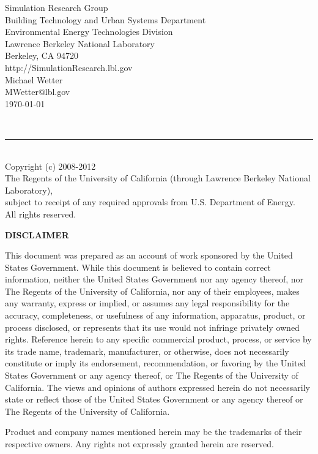 \documentclass[11pt]{report}
\renewcommand{\date}{\today}
\begin{document}
\begin{titlepage}
\begin{minipage}{\headwidth}
\begin{center}
\large{Simulation Research Group}\\
\large{Building Technology and Urban Systems Department}\\
 \large{Environmental
Energy Technologies Division}\\
\large{Lawrence Berkeley National
Laboratory}\\
\large{Berkeley, CA 94720}
\\[10mm]
\large{http://SimulationResearch.lbl.gov}
\\[10mm]
\large{Michael Wetter}\\
\large{MWetter@lbl.gov}
\\[10mm]
\large{\date}
\\[40mm]
\end{center}
~\\[15mm]
\hrule
~\\[2mm]
Copyright (c) 2008-2012\\
The Regents of the University of California 
(through Lawrence Berkeley National Laboratory),\\
subject to receipt of any required approvals from U.S. Department of Energy.\\
All rights reserved.
\end{minipage}
\end{titlepage}

\begin{center}
\bf \Large DISCLAIMER
\end{center}
This document was prepared as an account of work sponsored by the United States
Government. While this document is believed to contain correct information, neither the
United States Government nor any agency thereof, nor The Regents of the University of
California, nor any of their employees, makes any warranty, express or implied, or assumes
any legal responsibility for the accuracy, completeness, or usefulness of any information,
apparatus, product, or process disclosed, or represents that its use would not infringe
privately owned rights. Reference herein to any specific commercial product, process, or
service by its trade name, trademark, manufacturer, or otherwise, does not necessarily
constitute or imply its endorsement, recommendation, or favoring by the United States
Government or any agency thereof, or The Regents of the University of California. The
views and opinions of authors expressed herein do not necessarily state or reflect those of the
United States Government or any agency thereof or The Regents of the University of
California.

\vfill
\small{\vspace{2mm} \noindent Product and company names mentioned herein may be the trademarks of their respective owners. Any rights not expressly granted herein are reserved.}
\end{document}
